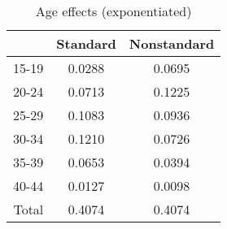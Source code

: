 \begin{table}[ht]
\centering
\caption{Age effects (exponentiated)} 
\label{tab:fertility_age_effects}
\begin{tabular}{rcc}
  \hline
 & Standard & Nonstandard \\ 
  \hline
15-19 & 0.0288 & 0.0695 \\ 
  20-24 & 0.0713 & 0.1225 \\ 
  25-29 & 0.1083 & 0.0936 \\ 
  30-34 & 0.1210 & 0.0726 \\ 
  35-39 & 0.0653 & 0.0394 \\ 
  40-44 & 0.0127 & 0.0098 \\ 
   \hline
Total & 0.4074 & 0.4074 \\ 
   \hline
\end{tabular}
\end{table}

